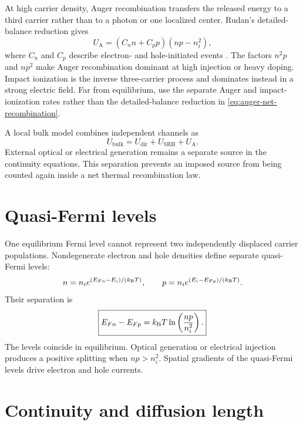 At high carrier density, Auger recombination transfers the released energy to a
third carrier rather than to a photon or one localized center.  Rudan's
detailed-balance reduction gives
\begin{equation}
  U_{\mathrm A}
  =\left(C_nn+C_pp\right)(np-n_i^2),
  \label{eq:auger-net-recombination}
\end{equation}
where $C_n$ and $C_p$ describe electron- and hole-initiated events
\cite[Sec.~20.3, Eqs.~(20.41)--(20.43)]{rudan2015}.  The factors $n^2p$ and
$np^2$ make Auger recombination dominant at high injection or heavy doping.
Impact ionization is the inverse three-carrier process and dominates instead in
a strong electric field.  Far from equilibrium, use the separate Auger and
impact-ionization rates rather than the detailed-balance reduction in
\cref{eq:auger-net-recombination}.

A local bulk model combines independent channels as
\begin{equation}
  U_{\mathrm{bulk}}
  =U_{\mathrm{dir}}+U_{\mathrm{SRH}}+U_{\mathrm A}.
  \label{eq:total-bulk-recombination}
\end{equation}
External optical or electrical generation remains a separate source in the
continuity equations.  This separation prevents an imposed source from being
counted again inside a net thermal recombination law.

\section{Quasi-Fermi levels}

One equilibrium Fermi level cannot represent two independently displaced
carrier populations.  Nondegenerate electron and hole densities define
separate quasi-Fermi levels:
\begin{equation}
  n=n_i e^{(E_{Fn}-E_i)/(k_{\mathrm B} T)},
  \qquad
  p=n_i e^{(E_i-E_{Fp})/(k_{\mathrm B} T)}.
  \label{eq:quasi-fermi-definitions}
\end{equation}
Their separation is
\begin{equation}
  \boxed{
  E_{Fn}-E_{Fp}=k_{\mathrm B} T\ln\left(\frac{np}{n_i^2}\right).
  }
  \label{eq:quasi-fermi-splitting}
\end{equation}
The levels coincide in equilibrium.  Optical generation or electrical
injection produces a positive splitting when $np>n_i^2$.  Spatial gradients of
the quasi-Fermi levels drive electron and hole currents.

\section{Continuity and diffusion length}

